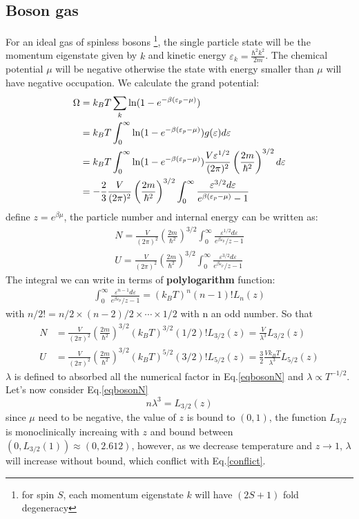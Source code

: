 \documentclass{article}
\begin{document}
\subsection*{Boson gas}
For an ideal gas of spinless bosons \footnote{for spin $S$, each momentum eigenstate $k$ will have $(2S+1)$ fold degeneracy}, 
the single particle state will be the momentum eigenstate given by 
$k$ and kinetic energy $\varepsilon_k = \frac{\hbar^2k^2}{2m}$. The chemical potential $\mu$ will be negative otherwise 
the state with energy smaller than $\mu$ will have negative occupation.
We calculate the grand potential:
\begin{align}
    \Omega &= k_BT \sum_k \ln(1-e^{-\beta(\varepsilon_p - \mu)}) \notag \\
            &= k_BT \int_0^{\infty} \ln(1-e^{-\beta(\varepsilon_p - \mu)}) g(\varepsilon) d\varepsilon \notag \\
            &= k_BT \int_0^{\infty} \ln(1-e^{-\beta(\varepsilon_p - \mu)}) \frac{V\varepsilon^{1/2}}{(2\pi)^2}\left(\frac{2m}{\hbar^2}\right)^{3/2} d\varepsilon \notag \\
            &= -\frac{2}{3} \frac{V}{(2\pi)^2}\left(\frac{2m}{\hbar^2}\right)^{3/2} \int_0^{\infty} \frac{\varepsilon^{3/2}d\varepsilon}{e^{\beta(\varepsilon_p - \mu)}-1} \label{todos}
\end{align}
define $z = e^{\beta\mu}$, the particle number and internal energy can be written as:
\begin{align}
    N = \frac{V}{(2\pi)^2}\left(\frac{2m}{\hbar^2}\right)^{3/2} \int_0^{\infty} \frac{\varepsilon^{1/2}d\varepsilon}{e^{\beta\varepsilon_p}/z-1} \\
    U = \frac{V}{(2\pi)^2}\left(\frac{2m}{\hbar^2}\right)^{3/2} \int_0^{\infty} \frac{\varepsilon^{3/2}d\varepsilon}{e^{\beta\varepsilon_p}/z-1}
\end{align}
The integral we can write in terms of \textbf{polylogarithm} function:
\begin{align}
    \int_0^{\infty} \frac{\varepsilon^{n-1}d\varepsilon}{e^{\beta\varepsilon_p}/z-1} = (k_BT)^n (n-1)! L_n(z)
\end{align}
with $n/2! = n/2 \times (n-2)/2 \times \cdots \times 1/2$ with n an odd number.
So that 
\begin{align}
    N &= \frac{V}{(2\pi)^2}\left(\frac{2m}{\hbar^2}\right)^{3/2} (k_BT)^{3/2} (1/2)! L_{3/2}(z) = \frac{V}{\lambda^3} L_{3/2}(z) \label{eqbosonN} \\
    U &= \frac{V}{(2\pi)^2}\left(\frac{2m}{\hbar^2}\right)^{3/2} (k_BT)^{5/2} (3/2)! L_{5/2}(z) = \frac{3}{2}\frac{Vk_BT}{\lambda^3} L_{5/2}(z)
\end{align}
$\lambda$ is defined to absorbed all the numerical factor in Eq.\ref{eqbosonN} and $\lambda \propto T^{-1/2}$. 
Let's now consider Eq.\ref{eqbosonN}
\begin{equation}
    n \lambda^3 = L_{3/2}(z) \label{conflict}
\end{equation}
since $\mu$ need to be negative, the value of $z$ is bound to $(0,1)$, the function $L_{3/2}$ is monoclinically increaing with $z$ and bound
between $(0,L_{3/2}(1)) \approx (0,2.612)$, however, as we decrease temperature and $z \to 1$, 
$\lambda$ will increase without bound, which conflict with Eq.\ref{conflict}. 
\end{document}
